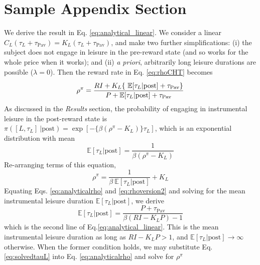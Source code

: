 \documentclass[manuscript]{stjour}
\def\taupav{\tau_{\mathrm{Pav}}}
\begin{document}





\appendix

\section{Sample Appendix Section}
We derive the result in Eq. \eqref{eq:analytical_linear}. We consider a linear $C_L(\tau_L+\taupav)=K_L(\tau_L+\taupav)$, and
make two further 
simplifications: (i) the subject does not
engage in leisure in the pre-reward state (and so works for the whole
price when it works); and (ii) \emph{a priori}, arbitrarily long leisure durations are possible
($\lambda=0$).
Then the reward rate in Eq. \eqref{eq:rhoCHT} becomes
\begin{equation}\label{eq:analyticalrho}
\rho^{\pi}= \frac{\vrule height 10pt width0pt RI + K_L \{~ \mathbb{E}[ \tau_L | \textrm{post} ] + \taupav  \} }
     {P +
\mathbb{E}[ \tau_L | \textrm{post} ] +\taupav  } 
\end{equation} 
As discussed in the \emph{Results} section, the probability of engaging in instrumental leisure in the post-reward state is $\pi([L,\tau_L]
~| \textrm{post}) = \exp\left[-\{\beta (\rho^\pi-K_L) 
 \} \tau_L\right]$, which is an exponential distribution with
mean 
\begin{equation}
\mathbb{E}[\tau_L | \textrm{post}]=\frac{1}{\beta (\rho^\pi-K_L) }
\label{eq:analyticaltauL}
\end{equation}  
Re-arranging terms of this equation,
\begin{equation}\label{eq:rhoversion2}
\rho^{\pi}=\frac{1}{\beta ~\mathbb{E}[\tau_L | \textrm{post}]} +K_L 
\end{equation} 
Equating Eqs. \eqref{eq:analyticalrho} and \eqref{eq:rhoversion2} and solving for the mean instrumental leisure duration $\mathbb{E}[\tau_L | \textrm{post}]$, we derive
\begin{equation}
\mathbb{E}[\tau_L | \textrm{post}] = \frac{P+\taupav}{\beta ( RI - K_LP)-1} 
\label{eq:solvedtauL}
\end{equation}
which is the second line of Eq.\eqref{eq:analytical_linear}. This is the mean instrumental leisure duration as long as  $RI - K_LP>1$, and  $\mathbb{E}[\tau_L | \textrm{post}] \rightarrow \infty$ otherwise. When the former condition holds, we may
substitute Eq. \eqref{eq:solvedtauL} into Eq. \eqref{eq:analyticalrho} and solve for $\rho^{\pi}$
\end{document}
